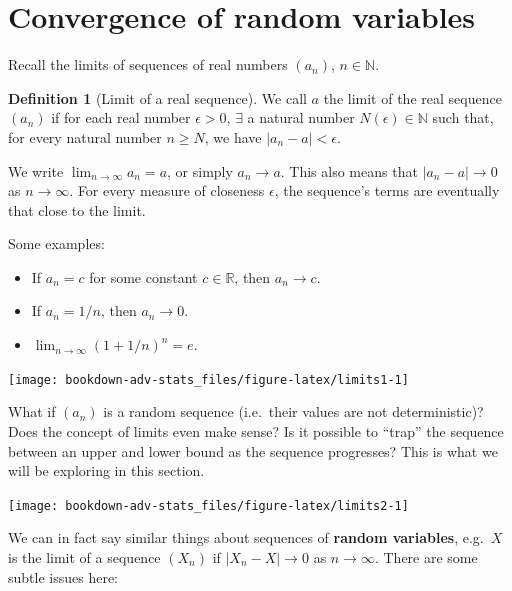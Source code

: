 \documentclass[
]{book}
\providecommand{\tightlist}{%
  \setlength{\itemsep}{0pt}\setlength{\parskip}{0pt}}
\newcommand{\bbR}{\mathbb{R}}
\newcommand{\bbN}{\mathbb{N}}
\theoremstyle{definition}
\newtheorem{definition}{Definition}[chapter]
\theoremstyle{definition}
\theoremstyle{definition}
\theoremstyle{definition}
\theoremstyle{remark}
\begin{document}
\hypertarget{convergence-of-random-variables}{%
\section{Convergence of random variables}\label{convergence-of-random-variables}}

Recall the limits of sequences of real numbers \((a_n)\), \(n\in\bbN\).

\begin{definition}[Limit of a real sequence]
We call \(a\) the limit of the real sequence \((a_n)\) if for each real
number \(\epsilon>0\), \(\exists\) a natural number \(N(\epsilon)\in\bbN\) such that, for
every natural number \(n\geq N\), we have \(|a_n-a| < \epsilon\).
\end{definition}

We write \(\lim_{n\to\infty} a_n = a\), or simply \(a_n \to a\). This also
means that \(|a_n-a| \to 0\) as \(n\to\infty\). For every measure of
closeness \(\epsilon\), the sequence's terms are eventually that close to
the limit.

Some examples:

\begin{itemize}
\tightlist
\item
  If \(a_n=c\) for some constant \(c\in\bbR\), then \(a_n\to c\).
\item
  If \(a_n=1/n\), then \(a_n\to 0\).
\item
  \(\lim_{n\to\infty}(1+1/n)^n = e\).
\end{itemize}

\begin{center}\texttt{[image: bookdown-adv-stats\_files/figure-latex/limits1-1]} \end{center}

What if \((a_n)\) is a random sequence (i.e.~their values are not deterministic)?
Does the concept of limits even make sense?
Is it possible to ``trap'' the sequence between an upper and lower bound as the sequence progresses?
This is what we will be exploring in this section.

\begin{center}\texttt{[image: bookdown-adv-stats\_files/figure-latex/limits2-1]} \end{center}

We can in fact say similar things about sequences of \textbf{random variables}, e.g.~\(X\) is the limit of a sequence
\((X_n)\) if \(|X_n - X|\to 0\) as \(n\to\infty\).
There are some subtle issues here:
\end{document}
